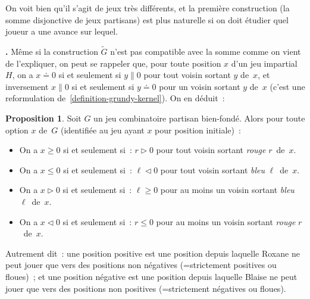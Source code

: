 \documentclass[12pt,a4paper]{article}
\theoremstyle{definition}
\newcommand\thingy{%
\refstepcounter{comcnt}\smallskip\noindent\textbf{\thecomcnt.} }
\newtheorem{prop}[comcnt]{Proposition}
\newcommand{\fuzzy}{\mathrel{\|}}
\begin{document}
On voit bien qu'il s'agit de jeux très différents, et la première
construction (la somme disjonctive de jeux partisans) est plus
naturelle si on doit étudier quel joueur a une avance sur lequel.

\thingy Même si la construction $\tilde G$ n'est pas compatible avec
la somme comme on vient de l'expliquer, on peut se rappeler que, pour
toute position $x$ d'un jeu impartial $H$, on a $x \doteq 0$ si et
seulement si $y \fuzzy 0$ pour tout voisin sortant $y$ de $x$, et
inversement $x \fuzzy 0$ si et seulement si $y \doteq 0$ pour un
voisin sortant $y$ de $x$ (c'est une reformulation
de \ref{definition-grundy-kernel}).  On en déduit :

\begin{prop}
Soit $G$ un jeu combinatoire partisan bien-fondé.  Alors pour toute
option $x$ de $G$ (identifiée au jeu ayant $x$ pour position
initiale) :
\begin{itemize}
\item On a $x \geq 0$ si et seulement si : $r \vartriangleright 0$
  pour tout voisin sortant \emph{rouge} $r$ de $x$.
\item On a $x \leq 0$ si et seulement si : $\ell \vartriangleleft 0$
  pour tout voisin sortant \emph{bleu} $\ell$ de $x$.
\item On a $x \vartriangleright 0$ si et seulement si : $\ell \geq 0$
  pour au moins un voisin sortant \emph{bleu} $\ell$ de $x$.
\item On a $x \vartriangleleft 0$ si et seulement si : $r \leq 0$ pour
  au moins un voisin sortant \emph{rouge} $r$ de $x$.
\end{itemize}
Autrement dit : une position positive est une position depuis laquelle
Roxane ne peut jouer que vers des positions non négatives
(=strictement positives ou floues) ; et une position négative est une
position depuis laquelle Blaise ne peut jouer que vers des positions
non positives (=strictement négatives ou floues).
\end{prop}
\end{document}
